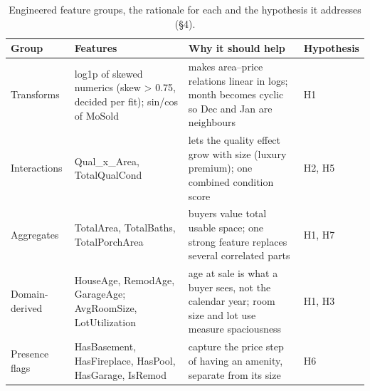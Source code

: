 \begin{table}[t]
\centering
\small
\begin{tabular}{llll}
\toprule
Group & Features & Why it should help & Hypothesis \\
\midrule
Transforms & log1p of skewed numerics (skew > 0.75, decided per fit); sin/cos of MoSold & makes area–price relations linear in logs; month becomes cyclic so Dec and Jan are neighbours & H1 \\
Interactions & Qual\_x\_Area, TotalQualCond & lets the quality effect grow with size (luxury premium); one combined condition score & H2, H5 \\
Aggregates & TotalArea, TotalBaths, TotalPorchArea & buyers value total usable space; one strong feature replaces several correlated parts & H1, H7 \\
Domain-derived & HouseAge, RemodAge, GarageAge; AvgRoomSize, LotUtilization & age at sale is what a buyer sees, not the calendar year; room size and lot use measure spaciousness & H1, H3 \\
Presence flags & HasBasement, HasFireplace, HasPool, HasGarage, IsRemod & capture the price step of having an amenity, separate from its size & H6 \\
\bottomrule
\end{tabular}
\caption{Engineered feature groups, the rationale for each and the hypothesis it addresses (§4).}
\label{tab:feature_groups}
\end{table}
